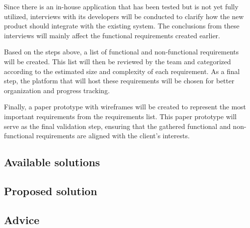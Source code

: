 Since there is an in-house application that has been tested but is not yet fully utilized, interviews with its developers will be conducted to clarify how the new product should integrate with the existing system. The conclusions from these interviews will mainly affect the functional requirements created earlier.

Based on the steps above, a list of functional and non-functional requirements will be created. This list will then be reviewed by the team and categorized according to the estimated size and complexity of each requirement. As a final step, the platform that will host these requirements will be chosen for better organization and progress tracking.

Finally, a paper prototype with wireframes will be created to represent the most important requirements from the requirements list. This paper prototype will serve as the final validation step, ensuring that the gathered functional and non-functional requirements are aligned with the client’s interests. 


 

\subsection{Available solutions}
\label{subsec:Available solutions}

\subsection{Proposed solution}
\label{subsec:Proposed solution}

\subsection{Advice}
\label{subsec:Advice}

